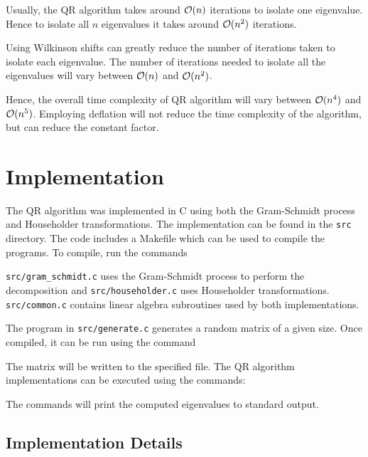\documentclass{article}
\begin{document}
Usually, the QR algorithm takes around $\mathcal{O}(n)$ iterations to isolate one eigenvalue.
Hence to isolate all $n$ eigenvalues it takes around $\mathcal{O}(n^2)$ iterations. 

Using Wilkinson shifts can greatly reduce the number of iterations taken to isolate each
eigenvalue. The number of iterations needed to isolate all the eigenvalues will vary between
$\mathcal{O}(n)$ and $\mathcal{O}(n^2)$. 

Hence, the overall time complexity of QR algorithm will vary between $\mathcal{O}(n^4)$ and $\mathcal{O}(n^5)$.
Employing deflation will not reduce the time complexity of the algorithm, but can reduce the
constant factor.


\section{Implementation}

The QR algorithm was implemented in C using both the Gram-Schmidt process and 
Householder transformations. The implementation can be found in the \texttt{src} directory.
The code includes a Makefile which can be used to compile the programs. To compile,
run the commands


\texttt{src/gram\_schmidt.c} uses the Gram-Schmidt process to perform the
decomposition and \texttt{src/householder.c} uses Householder transformations.
\texttt{src/common.c} contains linear algebra subroutines used by both implementations.

The program in \texttt{src/generate.c} generates a random matrix of a given size.
Once compiled, it can be run using the command


The matrix will be written to the specified file. The QR algorithm implementations can be
executed using the commands:


The commands will print the computed eigenvalues to standard output.

\subsection{Implementation Details}
\end{document}
